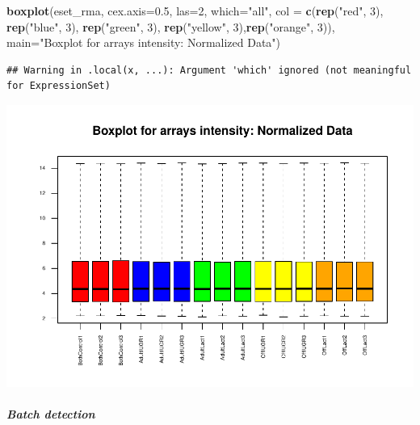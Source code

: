 \documentclass[]{article}
\newenvironment{Shaded}{\begin{snugshade}}{\end{snugshade}}
\newcommand{\KeywordTok}[1]{\textcolor[rgb]{0.13,0.29,0.53}{\textbf{#1}}}
\newcommand{\DataTypeTok}[1]{\textcolor[rgb]{0.13,0.29,0.53}{#1}}
\newcommand{\DecValTok}[1]{\textcolor[rgb]{0.00,0.00,0.81}{#1}}
\newcommand{\FloatTok}[1]{\textcolor[rgb]{0.00,0.00,0.81}{#1}}
\newcommand{\StringTok}[1]{\textcolor[rgb]{0.31,0.60,0.02}{#1}}
\newcommand{\NormalTok}[1]{#1}
\let\oldsubparagraph\subparagraph
\renewcommand{\subparagraph}[1]{\oldsubparagraph{#1}\mbox{}}
\begin{document}
\begin{Shaded}
\begin{Highlighting}[]
\KeywordTok{boxplot}\NormalTok{(eset_rma, }\DataTypeTok{cex.axis=}\FloatTok{0.5}\NormalTok{, }\DataTypeTok{las=}\DecValTok{2}\NormalTok{,  }\DataTypeTok{which=}\StringTok{"all"}\NormalTok{, }
\DataTypeTok{col =} \KeywordTok{c}\NormalTok{(}\KeywordTok{rep}\NormalTok{(}\StringTok{"red"}\NormalTok{, }\DecValTok{3}\NormalTok{), }\KeywordTok{rep}\NormalTok{(}\StringTok{"blue"}\NormalTok{, }\DecValTok{3}\NormalTok{), }\KeywordTok{rep}\NormalTok{(}\StringTok{"green"}\NormalTok{, }\DecValTok{3}\NormalTok{), }\KeywordTok{rep}\NormalTok{(}\StringTok{"yellow"}\NormalTok{, }\DecValTok{3}\NormalTok{),}\KeywordTok{rep}\NormalTok{(}\StringTok{"orange"}\NormalTok{, }\DecValTok{3}\NormalTok{)),}
\DataTypeTok{main=}\StringTok{"Boxplot for arrays intensity: Normalized Data"}\NormalTok{)}
\end{Highlighting}
\end{Shaded}

\begin{verbatim}
## Warning in .local(x, ...): Argument 'which' ignored (not meaningful for ExpressionSet)
\end{verbatim}

\includegraphics{delVal_AnaIsabel_ADO_PEC1_files/figure-latex/unnamed-chunk-19-1.pdf}

\subparagraph{Batch detection}\label{batch-detection}
\end{document}

